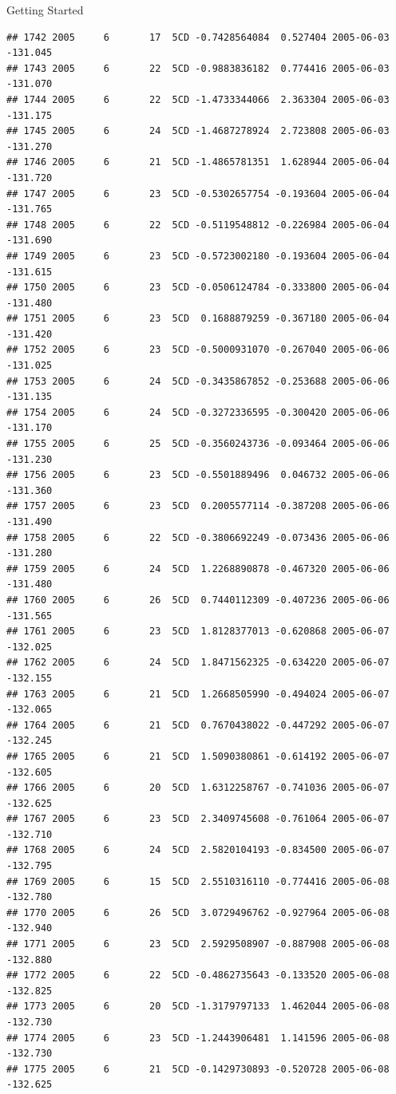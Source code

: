\documentclass[
  ignorenonframetext,
]{beamer}
\begin{document}
\begin{frame}[fragile]{Getting Started}
\begin{verbatim}
## 1742 2005     6       17  5CD -0.7428564084  0.527404 2005-06-03 -131.045
## 1743 2005     6       22  5CD -0.9883836182  0.774416 2005-06-03 -131.070
## 1744 2005     6       22  5CD -1.4733344066  2.363304 2005-06-03 -131.175
## 1745 2005     6       24  5CD -1.4687278924  2.723808 2005-06-03 -131.270
## 1746 2005     6       21  5CD -1.4865781351  1.628944 2005-06-04 -131.720
## 1747 2005     6       23  5CD -0.5302657754 -0.193604 2005-06-04 -131.765
## 1748 2005     6       22  5CD -0.5119548812 -0.226984 2005-06-04 -131.690
## 1749 2005     6       23  5CD -0.5723002180 -0.193604 2005-06-04 -131.615
## 1750 2005     6       23  5CD -0.0506124784 -0.333800 2005-06-04 -131.480
## 1751 2005     6       23  5CD  0.1688879259 -0.367180 2005-06-04 -131.420
## 1752 2005     6       23  5CD -0.5000931070 -0.267040 2005-06-06 -131.025
## 1753 2005     6       24  5CD -0.3435867852 -0.253688 2005-06-06 -131.135
## 1754 2005     6       24  5CD -0.3272336595 -0.300420 2005-06-06 -131.170
## 1755 2005     6       25  5CD -0.3560243736 -0.093464 2005-06-06 -131.230
## 1756 2005     6       23  5CD -0.5501889496  0.046732 2005-06-06 -131.360
## 1757 2005     6       23  5CD  0.2005577114 -0.387208 2005-06-06 -131.490
## 1758 2005     6       22  5CD -0.3806692249 -0.073436 2005-06-06 -131.280
## 1759 2005     6       24  5CD  1.2268890878 -0.467320 2005-06-06 -131.480
## 1760 2005     6       26  5CD  0.7440112309 -0.407236 2005-06-06 -131.565
## 1761 2005     6       23  5CD  1.8128377013 -0.620868 2005-06-07 -132.025
## 1762 2005     6       24  5CD  1.8471562325 -0.634220 2005-06-07 -132.155
## 1763 2005     6       21  5CD  1.2668505990 -0.494024 2005-06-07 -132.065
## 1764 2005     6       21  5CD  0.7670438022 -0.447292 2005-06-07 -132.245
## 1765 2005     6       21  5CD  1.5090380861 -0.614192 2005-06-07 -132.605
## 1766 2005     6       20  5CD  1.6312258767 -0.741036 2005-06-07 -132.625
## 1767 2005     6       23  5CD  2.3409745608 -0.761064 2005-06-07 -132.710
## 1768 2005     6       24  5CD  2.5820104193 -0.834500 2005-06-07 -132.795
## 1769 2005     6       15  5CD  2.5510316110 -0.774416 2005-06-08 -132.780
## 1770 2005     6       26  5CD  3.0729496762 -0.927964 2005-06-08 -132.940
## 1771 2005     6       23  5CD  2.5929508907 -0.887908 2005-06-08 -132.880
## 1772 2005     6       22  5CD -0.4862735643 -0.133520 2005-06-08 -132.825
## 1773 2005     6       20  5CD -1.3179797133  1.462044 2005-06-08 -132.730
## 1774 2005     6       23  5CD -1.2443906481  1.141596 2005-06-08 -132.730
## 1775 2005     6       21  5CD -0.1429730893 -0.520728 2005-06-08 -132.625

\end{verbatim}
\end{frame}
\end{document}
